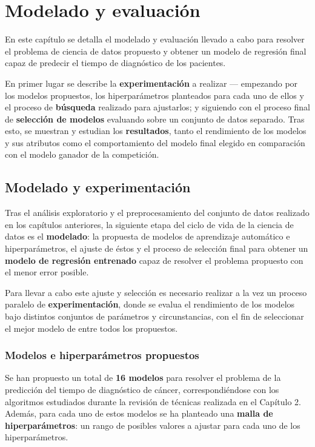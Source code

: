 \chapter{Modelado y evaluación}

En este capítulo se detalla el modelado y evaluación llevado a cabo para resolver el problema de ciencia de datos propuesto y obtener un modelo de regresión final capaz de predecir el tiempo de diagnóstico de los pacientes.

En primer lugar se describe la \textbf{experimentación} a realizar --- empezando por los modelos propuestos, los hiperparámetros planteados para cada uno de ellos y el proceso de \textbf{búsqueda} realizado para ajustarlos; y siguiendo con el proceso final de \textbf{selección de modelos} evaluando sobre un conjunto de datos separado. Tras esto, se muestran y estudian los \textbf{resultados}, tanto el rendimiento de los modelos y sus atributos como el comportamiento del modelo final elegido en comparación con el modelo ganador de la competición.

\section{Modelado y experimentación}

Tras el análisis exploratorio y el preprocesamiento del conjunto de datos realizado en los capítulos anteriores, la siguiente etapa del ciclo de vida de la ciencia de datos es el \textbf{modelado}: la propuesta de modelos de aprendizaje automático e hiperparámetros, el ajuste de éstos y el proceso de selección final para obtener un \textbf{modelo de regresión entrenado} capaz de resolver el problema propuesto con el menor error posible.

Para llevar a cabo este ajuste y selección es necesario realizar a la vez un proceso paralelo de \textbf{experimentación}, donde se evalua el rendimiento de los modelos bajo distintos conjuntos de parámetros y circunstancias, con el fin de seleccionar el mejor modelo de entre todos los propuestos.

\subsection{Modelos e hiperparámetros propuestos}

Se han propuesto un total de \textbf{16 modelos} para resolver el problema de la predicción del tiempo de diagnóstico de cáncer, correspondiéndose con los algoritmos estudiados durante la revisión de técnicas realizada en el Capítulo 2. Además, para cada uno de estos modelos se ha planteado una \textbf{malla de hiperparámetros}: un rango de posibles valores a ajustar para cada uno de los hiperparámetros.

